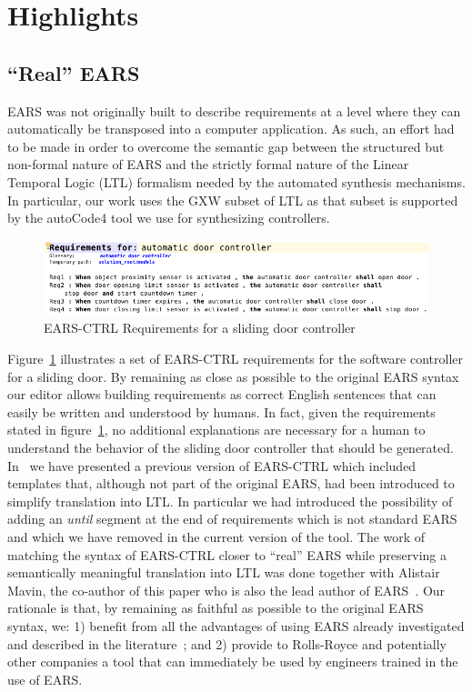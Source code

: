 \section{Highlights}
\subsection{``Real'' EARS}
EARS was not originally built to describe requirements at a level where they can
automatically be transposed into a computer application. As such, an effort had
to be made in order to overcome the semantic gap between the structured but
non-formal nature of EARS and the strictly formal nature of the Linear Temporal
Logic (LTL) formalism needed by the automated synthesis
mechanisms. In particular, our work uses the  \textsf{GXW} subset of LTL as that
subset is supported by the \textsf{autoCode4} tool we use for synthesizing
controllers.

\begin{figure}[h!]
   \begin{center}
     \includegraphics[width=.9\textwidth]{images/EARS-Reqs.png}
     \caption{\textsf{EARS-CTRL} Requirements for a sliding door
     controller} 
     \label{fig:ears_reqs}
   \end{center} 
 \end{figure}
Figure~\ref{fig:ears_reqs} illustrates a set of \textsf{EARS-CTRL}
requirements for the software controller for a sliding door. By remaining as close as
possible to the original EARS syntax our editor allows building requirements as
correct English sentences that can easily be written and understood by humans.
In fact, given the requirements stated in figure~\ref{fig:ears_reqs}, no
additional explanations are necessary for a human to understand the behavior of
the sliding door controller that should be generated. In~\cite{LucioRCM17} we
have presented a previous version of \textsf{EARS-CTRL} which included templates
that, although not part of the original EARS, had been introduced to simplify
translation into LTL. In particular we had introduced the possibility of adding
an \emph{until} segment at the end of requirements which is not standard EARS
and which we have removed in the current version of the tool.
The work of matching the syntax of \textsf{EARS-CTRL} closer to ``real'' EARS
while preserving a semantically meaningful translation into LTL was done
together with Alistair Mavin, the co-author of this paper who is also the lead author of EARS~\cite{EARS09}.
Our rationale is that, by remaining as faithful as possible to the original EARS
syntax, we: 1) benefit from all the advantages of using EARS already
investigated and described in the literature~\cite{EARS09,EARS16}; and 2)
provide to Rolls-Royce and potentially other companies a tool that can
immediately be used by engineers trained in the use of EARS.

